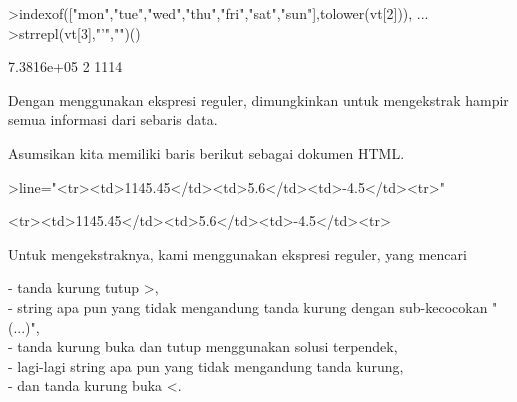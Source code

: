 \documentclass[a4paper,10pt]{article}
\begin{document}
\begin{eulernotebook}
\begin{eulercomment}
\begin{eulercomment}
\begin{eulercomment}
\begin{eulercomment}
\begin{eulercomment}
\begin{eulercomment}
\begin{eulercomment}
\begin{eulercomment}
\begin{eulercomment}
\begin{eulercomment}
\begin{eulercomment}
\begin{eulercomment}
\begin{eulercomment}
\begin{eulercomment}
\begin{eulercomment}
\begin{eulercomment}
\begin{eulercomment}
\begin{eulercomment}
\begin{eulercomment}
\begin{eulercomment}
\begin{eulercomment}
\begin{eulercomment}
\begin{eulercomment}
\begin{eulercomment}
\begin{eulercomment}
\begin{eulercomment}
\begin{eulercomment}
\begin{eulercomment}
\begin{eulercomment}
\begin{eulercomment}
\begin{eulercomment}
\begin{eulercomment}
\begin{eulercomment}
\begin{eulercomment}
\begin{eulercomment}
\begin{eulercomment}
\begin{eulerprompt}
>indexof(["mon","tue","wed","thu","fri","sat","sun"],tolower(vt[2])),  ...
>strrepl(vt[3],"'","")()
\end{eulerprompt}
\begin{euleroutput}
  7.3816e+05
  2
  1114
\end{euleroutput}
\begin{eulercomment}
Dengan menggunakan ekspresi reguler, dimungkinkan untuk mengekstrak
hampir semua informasi dari sebaris data.

Asumsikan kita memiliki baris berikut sebagai dokumen HTML.
\end{eulercomment}
\begin{eulerprompt}
>line="<tr><td>1145.45</td><td>5.6</td><td>-4.5</td><tr>"
\end{eulerprompt}
\begin{euleroutput}
  <tr><td>1145.45</td><td>5.6</td><td>-4.5</td><tr>
\end{euleroutput}
\begin{eulercomment}
Untuk mengekstraknya, kami menggunakan ekspresi reguler, yang mencari

- tanda kurung tutup \textgreater{},\\
- string apa pun yang tidak mengandung tanda kurung dengan
sub-kecocokan "(...)",\\
- tanda kurung buka dan tutup menggunakan solusi terpendek,\\
- lagi-lagi string apa pun yang tidak mengandung tanda kurung,\\
- dan tanda kurung buka \textless{}.


\end{eulercomment}
\end{eulercomment}
\end{eulercomment}
\end{eulercomment}
\end{eulercomment}
\end{eulercomment}
\end{eulercomment}
\end{eulercomment}
\end{eulercomment}
\end{eulercomment}
\end{eulercomment}
\end{eulercomment}
\end{eulercomment}
\end{eulercomment}
\end{eulercomment}
\end{eulercomment}
\end{eulercomment}
\end{eulercomment}
\end{eulercomment}
\end{eulercomment}
\end{eulercomment}
\end{eulercomment}
\end{eulercomment}
\end{eulercomment}
\end{eulercomment}
\end{eulercomment}
\end{eulercomment}
\end{eulercomment}
\end{eulercomment}
\end{eulercomment}
\end{eulercomment}
\end{eulercomment}
\end{eulercomment}
\end{eulercomment}
\end{eulercomment}
\end{eulercomment}
\end{eulercomment}
\end{eulernotebook}
\end{document}
